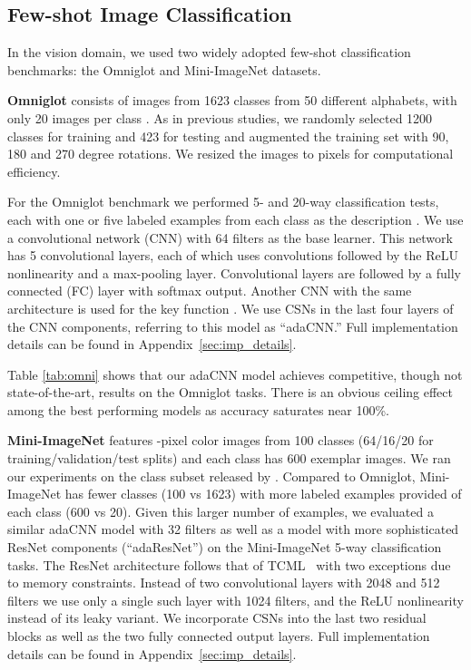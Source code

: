 \documentclass{article}
\begin{document}
\subsection{Few-shot Image Classification}
In the vision domain, we used two widely adopted few-shot classification benchmarks: the Omniglot and Mini-ImageNet datasets.

{\bf Omniglot} consists of images from 1623 classes from 50 different alphabets, with only 20 images per class \cite{lake2015human}. As in previous studies, we randomly selected 1200 classes for training and 423 for testing and augmented the training set with 90, 180 and 270 degree rotations. We resized the images to  pixels for computational efficiency.

For the Omniglot benchmark we performed 5- and 20-way classification tests, each with one or five labeled examples from each class as the description . We use a convolutional network (CNN) with 64 filters as the base learner. This network has 5 convolutional layers, each of which uses  convolutions followed by the ReLU nonlinearity and a  max-pooling layer. Convolutional layers are followed by a fully connected (FC) layer with softmax output. Another CNN with the same architecture is used for the key function . We use CSNs in the last four layers of the CNN components, referring to this model as ``adaCNN.'' Full implementation details can be found in Appendix~\ref{sec:imp_details}.

Table \ref{tab:omni} shows that our adaCNN model achieves competitive, though not state-of-the-art, results on the Omniglot tasks. There is an obvious ceiling effect among the best performing models as accuracy saturates near 100\%.

{\bf Mini-ImageNet} features -pixel color images from 100 classes (64/16/20 for training/validation/test splits) and each class has 600 exemplar images. We ran our experiments on the class subset released by \citet{Sachin2017}.
Compared to Omniglot, Mini-ImageNet has fewer classes (100 vs 1623) with more labeled examples provided of each class (600 vs 20). Given this larger number of examples,  we evaluated a similar adaCNN model with 32 filters as well as a model with more sophisticated ResNet components (``adaResNet'') on the Mini-ImageNet 5-way classification tasks. The ResNet architecture follows that of TCML~\citep{mishra2017meta} with two exceptions due to memory constraints. Instead of two  convolutional layers with 2048 and 512 filters we use only a single such layer with 1024 filters, and the ReLU nonlinearity instead of its leaky variant. We incorporate CSNs into the last two residual blocks as well as the two fully connected output layers. Full implementation details can be found in Appendix~\ref{sec:imp_details}.
\end{document}
